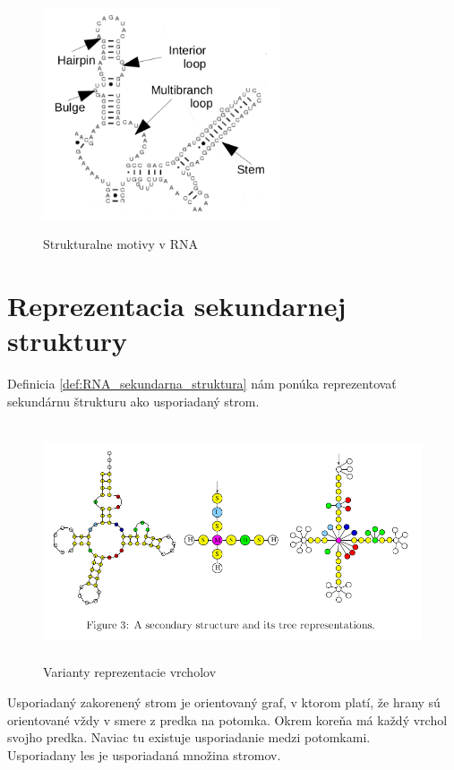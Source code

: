 
\begin{figure}[H]
\centering
\includegraphics[width=70mm, height=70mm]{../img/struktury_v_rna.png}
\caption{Strukturalne motivy v RNA}
\label{obr:RNA_motifs}
\end{figure}

\section{Reprezentacia sekundarnej struktury}

Definicia \ref{def:RNA_sekundarna_struktura} nám ponúka reprezentovať sekundárnu štrukturu
ako usporiadaný strom.

\begin{figure}[H]
\centering
\includegraphics[width=130mm, height=70mm]{../img/stromova_reprezentacia_rna.png}
\caption{Varianty reprezentacie vrcholov}
\label{obr:RNA_vrcholy}
\end{figure}

\begin{definice}\label{def:strom}
  Usporiadaný zakorenený strom je orientovaný graf, v ktorom platí, že hrany sú orientované
  vždy v smere z predka na potomka. Okrem koreňa má každý vrchol svojho predka.
  Naviac tu existuje usporiadanie medzi potomkami.
  \\
  Usporiadany les je usporiadaná množina stromov.
\end{definice}

